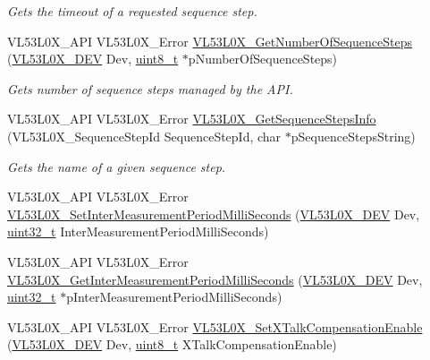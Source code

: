 \begin{DoxyCompactItemize}
\begin{DoxyCompactList}\small\item\em Gets the timeout of a requested sequence step. \end{DoxyCompactList}\item 
V\+L53\+L0\+X\+\_\+\+A\+PI V\+L53\+L0\+X\+\_\+\+Error \hyperlink{group__VL53L0X__parameters__group_ga04e798f39db282735d534e36bae9b4e8}{V\+L53\+L0\+X\+\_\+\+Get\+Number\+Of\+Sequence\+Steps} (\hyperlink{group__VL53L0X__platform__group_ga2d6405308b1dd524b462f1b8fb97d167}{V\+L53\+L0\+X\+\_\+\+D\+EV} Dev, \hyperlink{vl53l0x__types_8h_aba7bc1797add20fe3efdf37ced1182c5}{uint8\+\_\+t} $\ast$p\+Number\+Of\+Sequence\+Steps)
\begin{DoxyCompactList}\small\item\em Gets number of sequence steps managed by the A\+PI. \end{DoxyCompactList}\item 
V\+L53\+L0\+X\+\_\+\+A\+PI V\+L53\+L0\+X\+\_\+\+Error \hyperlink{group__VL53L0X__parameters__group_ga42e44b3fe3ea7f999fd7da3b94aa023e}{V\+L53\+L0\+X\+\_\+\+Get\+Sequence\+Steps\+Info} (V\+L53\+L0\+X\+\_\+\+Sequence\+Step\+Id Sequence\+Step\+Id, char $\ast$p\+Sequence\+Steps\+String)
\begin{DoxyCompactList}\small\item\em Gets the name of a given sequence step. \end{DoxyCompactList}\item 
V\+L53\+L0\+X\+\_\+\+A\+PI V\+L53\+L0\+X\+\_\+\+Error \hyperlink{group__VL53L0X__parameters__group_gac702606aaf8be1f7dc39a309997f28bc}{V\+L53\+L0\+X\+\_\+\+Set\+Inter\+Measurement\+Period\+Milli\+Seconds} (\hyperlink{group__VL53L0X__platform__group_ga2d6405308b1dd524b462f1b8fb97d167}{V\+L53\+L0\+X\+\_\+\+D\+EV} Dev, \hyperlink{vl53l0x__types_8h_a435d1572bf3f880d55459d9805097f62}{uint32\+\_\+t} Inter\+Measurement\+Period\+Milli\+Seconds)
\item 
V\+L53\+L0\+X\+\_\+\+A\+PI V\+L53\+L0\+X\+\_\+\+Error \hyperlink{group__VL53L0X__parameters__group_ga409fed78170c0ff606a125e514351324}{V\+L53\+L0\+X\+\_\+\+Get\+Inter\+Measurement\+Period\+Milli\+Seconds} (\hyperlink{group__VL53L0X__platform__group_ga2d6405308b1dd524b462f1b8fb97d167}{V\+L53\+L0\+X\+\_\+\+D\+EV} Dev, \hyperlink{vl53l0x__types_8h_a435d1572bf3f880d55459d9805097f62}{uint32\+\_\+t} $\ast$p\+Inter\+Measurement\+Period\+Milli\+Seconds)
\item 
V\+L53\+L0\+X\+\_\+\+A\+PI V\+L53\+L0\+X\+\_\+\+Error \hyperlink{group__VL53L0X__parameters__group_ga312b049fa776bc7a83502792a26a84d3}{V\+L53\+L0\+X\+\_\+\+Set\+X\+Talk\+Compensation\+Enable} (\hyperlink{group__VL53L0X__platform__group_ga2d6405308b1dd524b462f1b8fb97d167}{V\+L53\+L0\+X\+\_\+\+D\+EV} Dev, \hyperlink{vl53l0x__types_8h_aba7bc1797add20fe3efdf37ced1182c5}{uint8\+\_\+t} X\+Talk\+Compensation\+Enable)

\end{DoxyCompactItemize}
